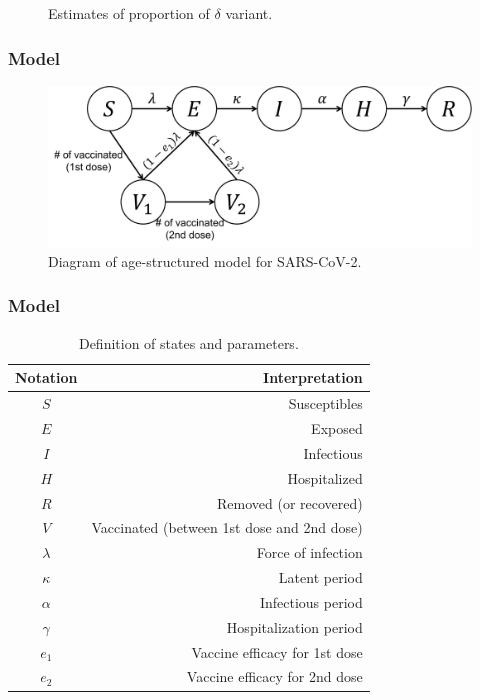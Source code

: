 \documentclass[aspectratio=169, 9pt, xcolor=dvipsnames]{beamer}
\begin{document}
\begin{frame}
\begin{minipage}{0.6\textwidth}
\begin{figure}
	    		\caption{Estimates of proportion of $\delta$ variant.}
	    	\end{figure}
	    \end{minipage}
	\end{frame}

	\begin{frame}\frametitle{Model}
	    \begin{figure}
	    	\centering
	    	\includegraphics[width=12cm]{diagram.pdf}
	    	\caption{Diagram of age-structured model for SARS-CoV-2.}
	    \end{figure}
	\end{frame}

	\begin{frame}\frametitle{Model}
	    \begin{table}
	    	\begin{tabular}{cr}
	    		\toprule
	    		\textbf{Notation} & \textbf{Interpretation} \\
	    		\midrule
	    		$S$ & Susceptibles \\
	    		$E$ & Exposed \\
	    		$I$ & Infectious \\
	    		$H$ & Hospitalized \\
	    		$R$ & Removed (or recovered) \\
	    		$V$ & Vaccinated (between 1st dose and 2nd dose) \\
	    		$\lambda$ & Force of infection \\
	    		$\kappa$ & Latent period \\
	    		$\alpha$ & Infectious period \\
	    		$\gamma$ & Hospitalization period \\
	    		$e_1$ & Vaccine efficacy for 1st dose \\
	    		$e_2$ & Vaccine efficacy for 2nd dose \\
	    		\bottomrule
	    	\end{tabular}
	    	\caption{Definition of states and parameters.}
	    \end{table}
	\end{frame}
\end{document}
